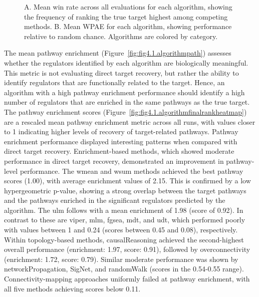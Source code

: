 
\begin{figure}[htbp]
  \centering
  \caption[Mean win rate and WPAE across all evaluations for each algorithm.]{A. Mean win rate across all evaluations for each algorithm, showing the frequency of ranking the true target highest among competing methods. B. Mean \gls{WPAE} for each algorithm, showing performance relative to random chance. Algorithms are colored by category.}
  \label{fig:fig4.3.WinandWPAE}
\end{figure}

The mean pathway enrichment (Figure~\ref{fig:fig4.1.algorithmpath}) assesses whether the regulators identified by each algorithm are biologically meaningful.
This metric is not evaluating direct target recovery, but rather the ability to identify regulators that are functionally related to the target.
Hence, an algorithm with a high pathway enrichment performance should identify a high number of regulators that are enriched in the same pathways as the true target.
The pathway enrichment scores (Figure~\ref{fig:fig4.1.algorithmfinalrankheatmap}) are a rescaled mean pathway enrichment metric across all runs, with values closer to 1 indicating higher levels of recovery of target-related pathways.
Pathway enrichment performance displayed interesting patterns when compared with direct target recovery.
Enrichment-based methods, which showed moderate performance in direct target recovery, demonstrated an improvement in pathway-level performance.
The wmean and wsum methods achieved the best pathway scores (1.00), with average enrichment values of 2.15. This is confirmed by a low hypergeometric p-value, showing a strong overlap between the target pathways and the pathways enriched in the significant regulators predicted by the algorithm.
The ulm follows with a mean enrichment of 1.98 (score of 0.92).
In contrast to these are viper, mlm, fgsea, mdt, and udt, which performed poorly with values between 1 and 0.24 (scores between 0.45 and 0.08), respectively.
Within topology-based methods, causalReasoning achieved the second-highest overall performance (enrichment: 1.97, score: 0.91), followed by overconnectivity (enrichment: 1.72, score: 0.79).
Similar moderate performance was shown by networkPropagation, SigNet, and randomWalk (scores in the 0.54-0.55 range).
Connectivity-mapping approaches uniformly failed at pathway enrichment, with all five methods achieving scores below 0.11.

